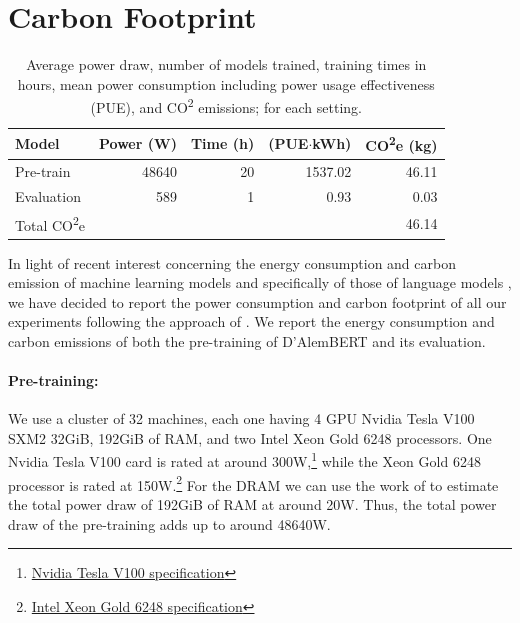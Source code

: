 \section{Carbon Footprint}\label{carbon-footprint-dalembert}

\begin{table}[th]
    \centering\small
        \begin{tabular}{lrrrr}
            \toprule
            \textbf{Model}               & {\textbf{Power (W)}} & {\textbf{Time (h)}} & {\textbf{(PUE$\cdotp$kWh)}} & {\textbf{CO\textsuperscript{2}e (kg)}} \\
            \midrule
            Pre-train                    & 48640                & 20                  & 1537.02                     & 46.11                                  \\
            Evaluation                   & 589                  & 1                   & 0.93                        & 0.03                                   \\
            \midrule
            Total CO\textsuperscript{2}e &                      &                     &                             & 46.14                                  \\
            \bottomrule
        \end{tabular}
    \caption{Average power draw, number of models trained, training times in hours, mean power consumption including power usage effectiveness (PUE), and CO\textsuperscript{2} emissions; for each setting.}
    \label{tab:carbon-dalembert}
\end{table}

In light of recent interest concerning the energy consumption and carbon emission of machine learning models and specifically of those of language models \cite{schwartz-etal-2020-green,bender-etal-2021-on}, we have decided to report the power consumption and carbon footprint of all our experiments following the approach of . We report the energy consumption and carbon emissions of both the pre-training of D'AlemBERT and its evaluation.

\paragraph{Pre-training:} We use a cluster of 32 machines, each one having 4 GPU Nvidia Tesla V100 SXM2 32GiB, 192GiB of RAM, and two Intel Xeon Gold 6248 processors. One Nvidia Tesla V100 card is rated at around 300W,\footnote{\href{https://www.nvidia.com/en-us/data-center/v100/}{ Nvidia Tesla V100 specification}} while the Xeon Gold 6248 processor is rated at 150W.\footnote{\href{https://ark.intel.com/content/www/us/en/ark/products/192446/intel-xeon-gold-6248-processor-27-5m-cache-2-50-ghz.html}{Intel Xeon Gold 6248 specification}} For the DRAM we can use the work of  to estimate the total power draw of 192GiB of RAM at around 20W. Thus, the total power draw of the pre-training adds up to around 48640W.

